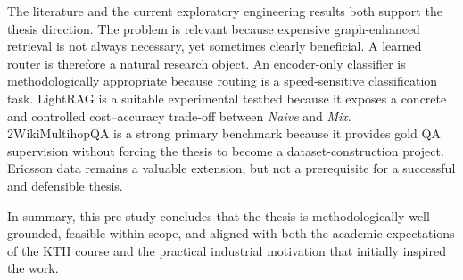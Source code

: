 \documentclass[11pt, a4paper]{article}
\begin{document}
The literature and the current exploratory engineering results both support the thesis direction. The problem is relevant because expensive graph-enhanced retrieval is not always necessary, yet sometimes clearly beneficial. A learned router is therefore a natural research object. An encoder-only classifier is methodologically appropriate because routing is a speed-sensitive classification task. LightRAG is a suitable experimental testbed because it exposes a concrete and controlled cost--accuracy trade-off between \emph{Naive} and \emph{Mix}. 2WikiMultihopQA is a strong primary benchmark because it provides gold QA supervision without forcing the thesis to become a dataset-construction project. Ericsson data remains a valuable extension, but not a prerequisite for a successful and defensible thesis.

In summary, this pre-study concludes that the thesis is methodologically well grounded, feasible within scope, and aligned with both the academic expectations of the KTH course and the practical industrial motivation that initially inspired the work.

\newpage
\end{document}
